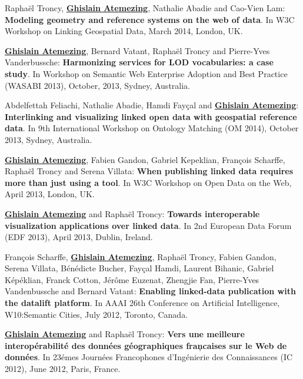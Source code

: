 \begin{enumerate}
{ \item Rapha{\"e}l Troncy, \underline{\textbf{Ghislain Atemezing}}, Nathalie Abadie and Cao-Vien Lam: \textbf{Modeling geometry and reference systems on the web of data}. In W3C Workshop on Linking Geospatial Data, March 2014, London, UK.

 \item \underline{\textbf{Ghislain Atemezing}}, Bernard Vatant, Rapha{\"e}l Troncy and Pierre-Yves Vanderbussche: \textbf{Harmonizing services for LOD vocabularies: a case study}. In Workshop on Semantic Web Enterprise Adoption and Best Practice (WASABI 2013), October, 2013, Sydney, Australia.

 \item Abdelfettah Feliachi, Nathalie Abadie, Hamdi Fay\c cal and \underline{\textbf{Ghislain Atemezing}}: \textbf{{I}nterlinking and visualizing linked open data with geospatial reference data}. In 9th International Workshop on Ontology Matching (OM 2014), October 2013, Sydney, Australia.

 \item \underline{\textbf{Ghislain Atemezing}}, Fabien Gandon, Gabriel Kepeklian, Fran\c{c}ois Scharffe, Rapha{\"e}l Troncy and Serena Villata: \textbf{When publishing linked data requires more than just using a tool}. In W3C Workshop on Open Data on the Web, April 2013, London, UK.

 \item \underline{\textbf{Ghislain Atemezing}} and Rapha{\"e}l Troncy: \textbf{Towards interoperable visualization applications over linked data}. In 2nd European Data Forum (EDF 2013), April 2013, Dublin, Ireland.

 \item Fran\c cois Scharffe, \underline{\textbf{Ghislain Atemezing}}, Rapha\"{e}l Troncy, Fabien Gandon, Serena Villata, B\'{e}n\'{e}dicte Bucher, Fay\c cal Hamdi, Laurent Bihanic, Gabriel K\'{e}p\'{e}klian, Franck Cotton, J\'{e}r\^{o}me Euzenat, Zhengjie Fan, Pierre-Yves Vandenbussche and Bernard Vatant: \textbf{Enabling linked-data publication with the datalift platform}. In AAAI 26th Conference on Artificial Intelligence, W10:Semantic Cities, July 2012, Toronto, Canada.

 \item \underline{\textbf{Ghislain Atemezing}} and Rapha\"{e}l Troncy: \textbf{Vers une meilleure interop\'{e}rabilit\'{e} des donn\'{e}es g\'{e}ographiques fran{\c}caises sur le Web de donn\'{e}es}. In 23\'{e}mes Journ\'{e}es Francophones d'Ing\'{e}nierie des Connaissances (IC 2012), June 2012, Paris, France.

}
\end{enumerate}
